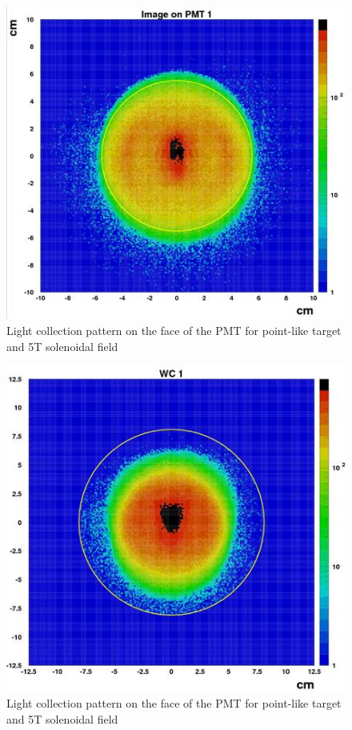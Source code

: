 \begin{figure}[!ht]
    \centering
    \includegraphics[width=1.0\linewidth,trim={0.0cm 0.0cm 0.0cm 0.0cm},clip]{images/10cm_Targ_5T_Field_PMT.jpg}
    \caption{Light collection pattern on the face of the PMT for point-like target and 5T solenoidal field}
    \label{fig:10cm_Targ_5T_Field_PMT}
\end{figure}

\begin{figure}[!ht]
    \centering
    \includegraphics[width=1.0\linewidth,trim={0.0cm 0.0cm 0.0cm 0.0cm},clip]{images/10cm_Targ_5T_Field_WCone.jpg}
    \caption{Light collection pattern on the face of the PMT for point-like target and 5T solenoidal field}
    \label{fig:10cm_Targ_5T_Field_WCone}
\end{figure}

